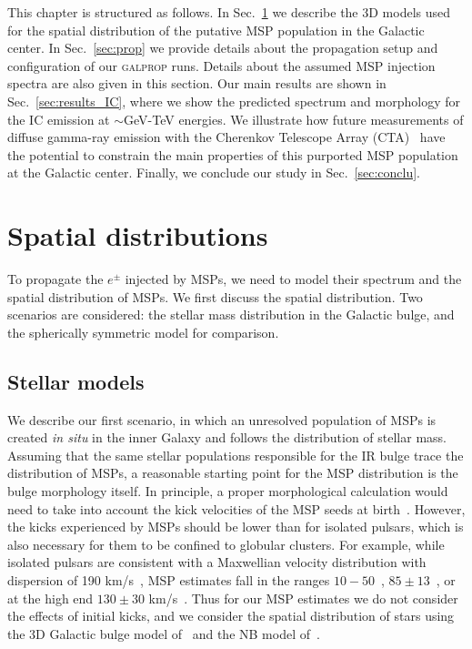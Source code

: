 \documentclass[doublespace,nopageskip]{VTthesis}
\begin{document}
This chapter is structured as follows. In Sec.~\ref{sec:spatial} we describe the 3D models used for the spatial distribution of the putative MSP population in the Galactic center. In Sec.~\ref{sec:prop} we provide details about the propagation setup and configuration of our \textsc{galprop} runs. Details about the assumed MSP injection spectra are also given in this section. Our main results are shown in Sec.~\ref{sec:results_IC}, where we show the predicted spectrum and morphology for the IC emission at $\sim$GeV-TeV energies. We illustrate how future measurements of diffuse gamma-ray emission with the Cherenkov Telescope Array (CTA)~\cite{2009arXiv0912.3742W,2011ExA....32..193A} have the potential to constrain the main properties of this purported MSP population at the Galactic center. Finally, we conclude our study in Sec.~\ref{sec:conclu}.

\section{Spatial distributions}\label{sec:spatial}

To propagate the $e^\pm$ injected by MSPs, we need to model their spectrum and the spatial distribution of MSPs. We first discuss the spatial distribution. Two scenarios are considered: the stellar mass distribution in the Galactic bulge, and the spherically symmetric model for comparison.

\subsection{Stellar models}\label{sec:stellar}

We describe our first scenario, in which an unresolved population of MSPs is created \emph{in situ} in the inner Galaxy and follows the distribution of stellar mass. Assuming that the same stellar populations responsible for the IR bulge trace the distribution of MSPs, a reasonable starting point for the MSP distribution is the bulge morphology itself. In principle, a proper morphological calculation would need to take into account the kick velocities of the MSP seeds at birth~\cite{2018ApJ...862...79E}. However, the kicks experienced by MSPs should be lower than for isolated pulsars, which is also necessary for them to be confined to globular clusters. For example, while isolated pulsars are consistent with a Maxwellian velocity distribution with dispersion of 190 km/s~\cite{1997MNRAS.291..569H}, MSP estimates fall in the ranges $10-50$~\cite{2013PhRvD..88h3009H,1997ApJ...482..971C}, $85\pm13$~\cite{2004IAUS..218..139H}, or at the high end $130\pm30$ km/s~\cite{1998MNRAS.295..743L}. Thus for our MSP estimates we do not consider the effects of initial kicks, and we consider the spatial distribution of stars using the 3D Galactic bulge model of~\citet{1998ApJ...492..495F} and the NB model of~\citet{2002A&A...384..112L}.
\end{document}
